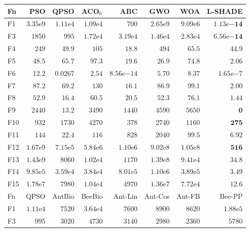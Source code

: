 \begin{tabular}{lrrrrrrr}
\toprule
Fn & PSO & QPSO & ACO$_\mathbb{R}$ & ABC & GWO & WOA & L-SHADE \\
\midrule
F1 & $3.35\mathrm{e}{9}$ & $1.11\mathrm{e}{4}$ & $1.09\mathrm{e}{4}$ & $700$ & $2.65\mathrm{e}{9}$ & $9.09\mathrm{e}{6}$ & $\mathbf{1.13\mathrm{e}{-14}}$ \\
F3 & $1850$ & $995$ & $1.72\mathrm{e}{4}$ & $3.19\mathrm{e}{4}$ & $1.46\mathrm{e}{4}$ & $2.83\mathrm{e}{4}$ & $\mathbf{6.56\mathrm{e}{-14}}$ \\
F4 & $249$ & $49.9$ & $105$ & $\mathbf{18.8}$ & $494$ & $65.5$ & $44.9$ \\
F5 & $48.5$ & $65.7$ & $97.3$ & $19.6$ & $26.9$ & $74.8$ & $\mathbf{2.06}$ \\
F6 & $12.2$ & $0.0267$ & $2.54$ & $8.56\mathrm{e}{-14}$ & $5.70$ & $8.37$ & $1.65\mathrm{e}{-7}$ \\
F7 & $87.2$ & $69.2$ & $130$ & $16.1$ & $86.9$ & $99.1$ & $\mathbf{2.00}$ \\
F8 & $52.9$ & $16.4$ & $60.5$ & $20.5$ & $52.3$ & $76.1$ & $\mathbf{1.44}$ \\
F9 & $2440$ & $13.2$ & $3490$ & $1440$ & $4590$ & $5650$ & $\mathbf{0}$ \\
F10 & $932$ & $1730$ & $4270$ & $378$ & $2740$ & $1160$ & $\mathbf{275}$ \\
F11 & $144$ & $22.4$ & $116$ & $828$ & $2040$ & $99.5$ & $\mathbf{6.92}$ \\
F12 & $1.67\mathrm{e}{9}$ & $7.15\mathrm{e}{5}$ & $5.84\mathrm{e}{6}$ & $1.10\mathrm{e}{6}$ & $9.02\mathrm{e}{8}$ & $1.05\mathrm{e}{8}$ & $\mathbf{516}$ \\
F13 & $1.43\mathrm{e}{9}$ & $8060$ & $1.02\mathrm{e}{4}$ & $1170$ & $1.39\mathrm{e}{8}$ & $9.41\mathrm{e}{4}$ & $\mathbf{34.8}$ \\
F14 & $9.85\mathrm{e}{5}$ & $3.59\mathrm{e}{4}$ & $3.84\mathrm{e}{4}$ & $8.01\mathrm{e}{5}$ & $1.10\mathrm{e}{6}$ & $3.89\mathrm{e}{5}$ & $\mathbf{3.49}$ \\
F15 & $1.78\mathrm{e}{7}$ & $7980$ & $1.04\mathrm{e}{4}$ & $4970$ & $1.36\mathrm{e}{7}$ & $7.72\mathrm{e}{4}$ & $\mathbf{12.6}$ \\
\midrule
Fn & QPSO & AntBio & BeeBio & Ant-Lin & Ant-Cos & Ant-FB & Bee-PP \\
\midrule
F1 & $1.11\mathrm{e}{4}$ & $7520$ & $3.64\mathrm{e}{4}$ & $7600$ & $8900$ & $8620$ & $1.88\mathrm{e}{5}$ \\
F3 & $995$ & $3020$ & $4730$ & $3140$ & $2980$ & $2360$ & $5780$ \\

\end{tabular}
